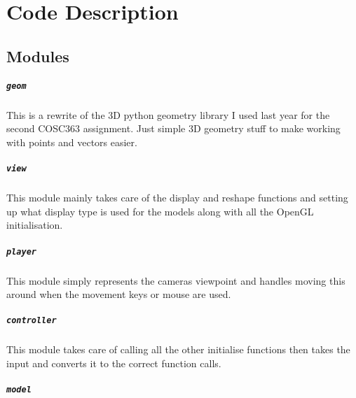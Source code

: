 \chapter{Code Description}

  \vspace{-30pt}
  \section{Modules}

    \paragraph{\texttt{geom}}

      This is a rewrite of the 3D python geometry library I used last year for
      the second COSC363 assignment.  Just simple 3D geometry stuff to make
      working with points and vectors easier.

    \vspace{-15pt}
    \paragraph{\texttt{view}}

      This module mainly takes care of the display and reshape functions and
      setting up what display type is used for the models along with all the
      OpenGL initialisation.

    \vspace{-15pt}
    \paragraph{\texttt{player}}

      This module simply represents the cameras viewpoint and handles moving
      this around when the movement keys or mouse are used.

    \vspace{-15pt}
    \paragraph{\texttt{controller}}

      This module takes care of calling all the other initialise functions then
      takes the input and converts it to the correct function calls.

    \vspace{-15pt}
    \paragraph{\texttt{model}}

